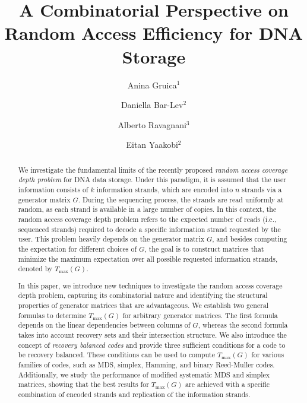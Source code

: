 \documentclass[11pt,a4paper,reqno,twoside]{amsart}
\title[A Combinatorial Perspective on Random Access Efficiency for DNA Storage]{\textbf{A Combinatorial Perspective on \\ Random Access Efficiency for DNA Storage}}
\author{Anina Gruica$^1$}
\author{Daniella Bar-Lev$^2$}
\author{Alberto Ravagnani$^3$}
\author{Eitan Yaakobi$^2$}
\theoremstyle{definition}
\newcommand{\tmax}{T_{\max}}
\begin{document}
\maketitle

\begin{abstract}
We investigate the fundamental limits of the recently proposed \emph{random access coverage depth problem} for DNA data storage. Under this paradigm, it is assumed that the user information consists of $k$ information strands, which are encoded into $n$ strands via a generator matrix $G$. During the sequencing process, the strands are read uniformly at random, as each strand is available in a large number of copies. In this context, the random access coverage depth problem refers to the expected number of reads (i.e., sequenced strands) required to decode a specific information strand requested by the user. This problem heavily depends on the generator matrix $G$, and besides computing the expectation for different choices of $G$, the goal is to construct matrices that minimize the maximum expectation over all possible requested information strands, denoted by $\tmax(G)$.

In this paper, we introduce new techniques to investigate the random access coverage depth problem, capturing its combinatorial nature and identifying the structural properties of generator matrices that are advantageous. We establish two general formulas to determine $\tmax(G)$ for arbitrary generator matrices. The first formula depends on the linear dependencies between columns of $G$, whereas the second formula takes into account recovery sets and their intersection structure. We also introduce the concept of \emph{recovery balanced codes} and provide three sufficient conditions for a code to be recovery balanced. These conditions can be used to compute $\tmax(G)$ for various families of codes, such as MDS, simplex, Hamming, and binary Reed-Muller codes. Additionally, we study the performance of modified systematic MDS and simplex matrices, showing that the best results for $\tmax(G)$ are achieved with a specific combination of encoded strands and replication of the information strands.


\end{abstract}
\end{document}
